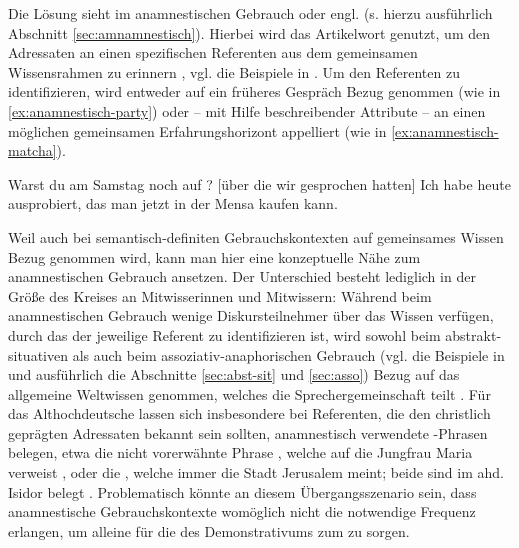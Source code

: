 \noindent
Die Lösung sieht \textcite{Himmelmann1997} im anamnestischen  Gebrauch oder engl.  (s. hierzu ausführlich Abschnitt \ref{sec:amnamnestisch}). Hierbei wird das Artikelwort genutzt, um den Adressaten an einen spezifischen Referenten aus dem gemeinsamen Wissensrahmen zu erinnern \parencite[61 und 81]{Himmelmann1997}, vgl. die Beispiele in . Um den Referenten zu identifizieren, wird  entweder auf ein früheres Gespräch Bezug genommen (wie in \ref{ex:anamnestisch-party}) oder -- mit Hilfe beschreibender Attribute --  an einen möglichen gemeinsamen Erfahrungshorizont appelliert (wie in \ref{ex:anamnestisch-matcha}).   

 \begin{exe}
	\ex 
	\begin{xlist} \label{ex:himmelmann}
		\ex \label{ex:anamnestisch-party}  Warst du am Samstag noch auf ? [über die wir gesprochen hatten]
		\ex \label{ex:anamnestisch-matcha} Ich habe heute  ausprobiert, das man jetzt in der Mensa kaufen kann.  
		\end{xlist}
\end{exe}

\noindent
Weil auch bei semantisch-definiten Gebrauchskontexten  auf gemeinsames Wissen Bezug genommen wird, kann man hier eine konzeptuelle Nähe zum anamnestischen  Gebrauch ansetzen. Der Unterschied besteht lediglich in der Größe des Kreises an Mitwisserinnen und Mitwissern: Während beim anamnestischen  Gebrauch wenige  Diskursteilnehmer über das Wissen verfügen, durch das der jeweilige Referent zu identifizieren ist,  wird sowohl beim abstrakt-situativen  als auch beim assoziativ-anaphorischen  Gebrauch (vgl. die Beispiele in  und ausführlich die Abschnitte \ref{sec:abst-sit} und \ref{sec:asso}) Bezug auf das allgemeine Weltwissen genommen, welches die Sprechergemeinschaft teilt \parencite[95]{Himmelmann1997}. Für das Althochdeutsche lassen sich insbesondere bei Referenten, die den christlich geprägten Adressaten bekannt sein sollten, anamnestisch  verwendete -Phrasen belegen, etwa die nicht vorerwähnte Phrase , welche auf die Jungfrau Maria verweist \parencite[74]{Szczepaniak2011a}, oder die  , welche immer die Stadt Jerusalem meint; beide sind im ahd. Isidor belegt \parencite{Flick2018}. Problematisch könnte an diesem Übergangsszenario sein, dass anamnestische  Gebrauchskontexte womöglich nicht die notwendige Frequenz erlangen, um alleine für die  des Demonstrativums  zum  zu sorgen. 

